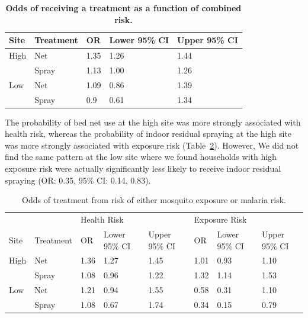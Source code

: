 \documentclass[10pt,letterpaper]{article}\usepackage[]{graphicx}\usepackage[]{color}
\begin{document}
\begin{table}[!ht]
\begin{adjustwidth}{-2.25in}{0in} %
\centering
\caption{
{\bf Odds of receiving a treatment as a function of combined risk.} 
}
\begin{tabular}{lllll}
  \hline 
Site & Treatment & OR & Lower 95\% CI & Upper 95\% CI \\ 
  \hline
High & Net & 1.35 & 1.26 & 1.44 \\ 
   & Spray & 1.13 & 1.00 & 1.26 \\ 
  Low & Net & 1.09 & 0.86 & 1.39 \\ 
   & Spray & 0.9 & 0.61 & 1.34 \\ 
   \hline
\end{tabular}
\label{ORcmb}
\end{adjustwidth}
\end{table}

The probability of bed net use at the high site was more strongly associated with health risk,  whereas the probability of indoor residual spraying at the high site was more strongly associated with exposure risk (Table~\ref{ORtrt}).  However,  We did not find the same pattern at the low site where we found households with high exposure risk were actually significantly less likely to receive indoor residual spraying (OR: 0.35,  95\% CI: 0.14,  0.83).  \\






\begin{table}[!ht]
\begin{adjustwidth}{-2.25in}{0in} %
\centering
\caption{
{Odds of treatment from risk of either mosquito exposure or malaria risk.} 
}
\begin{tabular}{llllllll}
  \hline
 &  & \multicolumn{3}{l}{Health Risk} & \multicolumn{3}{l}{Exposure Risk}  \\ 
  
Site & Treatment & OR & Lower 95\% CI & Upper 95\% CI & OR & Lower 95\% CI & Upper 95\% CI \\ 
 \hline
  High & Net & 1.36 & 1.27 & 1.45 & 1.01 & 0.93 & 1.10 \\ 
   & Spray & 1.08 & 0.96 & 1.22 & 1.32 & 1.14 & 1.53 \\ 
  Low & Net & 1.21 & 0.94 & 1.55 & 0.58 & 0.31 & 1.10 \\ 
   & Spray & 1.08 & 0.67 & 1.74 & 0.34 & 0.15 & 0.79 \\ 
   \hline
\end{tabular}
\label{ORtrt}
\end{adjustwidth}
\end{table}
\end{document}
